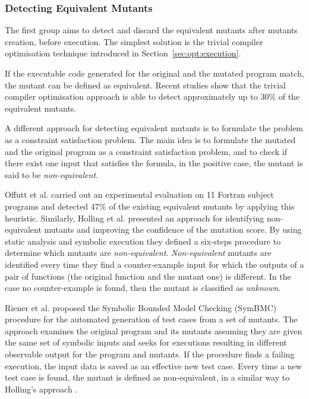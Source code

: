 \subsubsection{Detecting Equivalent Mutants}

The first group aims to detect and discard the equivalent mutants after mutants creation, before execution. The simplest solution is the trivial compiler optimisation \cite{papadakis2015trivial, kintis2017detecting,papadakis2019mutation} technique introduced in Section~\ref{sec:opt:execution}. 

If the executable code generated for the original and the mutated program match, the mutant can be defined as equivalent.
Recent studies \cite{papadakis2015trivial} show that the trivial compiler optimisation approach is able to detect approximately up to 30\% of the equivalent mutants.

A different approach for detecting equivalent mutants is to formulate the problem as a constraint satisfaction problem. 
The main idea is to formulate the mutated and the original program as a constraint satisfaction problem, and to check if there exist one input that satisfies the formula, in the positive case, the mutant is said to be \textit{non-equivalent}.

Offutt et al. \cite{offutt1996detecting,offutt1997automatically} carried out an experimental evaluation on 11 Fortran subject programs and detected 47\% of the existing equivalent mutants by applying this heuristic.
Similarly, Holling et al. \cite{holling2016nequivack,papadakis2012mutation} presented an approach for identifying non-equivalent mutants and improving the confidence of the mutation score. By using static analysis and symbolic execution they defined a six-steps procedure to determine which mutants are \textit{non-equivalent}. \textit{Non-equivalent} mutants are identified every time they find a counter-example input for which the outputs of a pair of functions (the original function and the mutant one) is different. In the case no counter-example is found, then the mutant is classified as \textit{unknown}. 

Riener et al. \cite{riener2011test} proposed the Symbolic Bounded Model Checking (SymBMC) procedure for the automated generation of test cases from a set of mutants. The approach examines the original program and its mutants assuming they are given the same set of symbolic  inputs and seeks for executions resulting in different observable output for the program and mutants. If the procedure finds a failing execution, the input data is saved as an effective new test case. Every time a new test case is found, the mutant is defined as non-equivalent, in a similar way to Holling's approach \cite{holling2016nequivack}.


